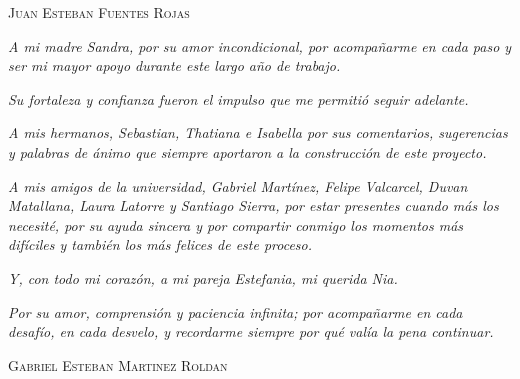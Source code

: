\documentclass[12pt,openright,oneside]{book}
\begin{document}
\vspace*{\fill}

\begin{flushleft}
    \textsc{Juan Esteban Fuentes Rojas}
\end{flushleft}
\vspace{1cm} 

\begin{center}
\textit{A mi madre Sandra, por su amor incondicional, por acompañarme en cada paso y ser mi mayor apoyo durante este largo año de trabajo.}  

\textit{Su fortaleza y confianza fueron el impulso que me permitió seguir adelante.}  

\vspace{0.8cm}

\textit{A mis hermanos, Sebastian, Thatiana e Isabella por sus comentarios, sugerencias y palabras de ánimo que siempre aportaron a la construcción de este proyecto.}

\vspace{0.8cm}

\textit{A mis amigos de la universidad, Gabriel Martínez, Felipe Valcarcel, Duvan Matallana, Laura Latorre y Santiago Sierra, por estar presentes cuando más los necesité, por su ayuda sincera y por compartir conmigo los momentos más difíciles y también los más felices de este proceso.}  

\vspace{0.8cm}

\textit{Y, con todo mi corazón, a mi pareja Estefania, mi querida Nia.}  

\textit{Por su amor, comprensión y paciencia infinita; por acompañarme en cada desafío, en cada desvelo, y recordarme siempre por qué valía la pena continuar.}
\end{center}
\vspace*{\fill}

\newpage

\vspace*{\fill}

\begin{flushleft}
    \textsc{Gabriel Esteban Martinez Roldan}
\end{flushleft}
\vspace{1cm}
\end{document}
